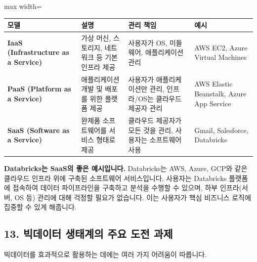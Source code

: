 \documentclass[11pt,a4paper]{article}
\theoremstyle{definition}
\begin{document}
\begin{adjustbox}{max width=\textwidth}
\begin{tabular}{llll}
\toprule
\textbf{모델} & \textbf{설명} & \textbf{관리 책임} & \textbf{예시} \\
\midrule
\textbf{IaaS (Infrastructure as a Service)} & 가상 머신, 스토리지, 네트워크 등 기본 인프라 제공 & 사용자가 OS, 미들웨어, 애플리케이션 관리 & AWS EC2, Azure Virtual Machines \\
\textbf{PaaS (Platform as a Service)} & 애플리케이션 개발 및 배포를 위한 플랫폼 제공 & 사용자가 애플리케이션만 관리, 인프라/OS는 클라우드 제공자 관리 & AWS Elastic Beanstalk, Azure App Service \\
\textbf{SaaS (Software as a Service)} & 완제품 소프트웨어를 서비스 형태로 제공 & 클라우드 제공자가 모든 것을 관리, 사용자는 소프트웨어 사용 & Gmail, Salesforce, Databricks \\
\bottomrule
\end{tabular}
\end{adjustbox}

\begin{examplebox}
\textbf{Databricks는 SaaS의 좋은 예시입니다.}
Databricks는 AWS, Azure, GCP와 같은 클라우드 인프라 위에 구축된 소프트웨어 서비스입니다. 사용자는 Databricks 플랫폼에 접속하여 데이터 파이프라인을 구축하고 분석을 수행할 수 있으며, 하부 인프라(서버, OS 등) 관리에 대해 걱정할 필요가 없습니다. 이는 사용자가 핵심 비즈니스 로직에 집중할 수 있게 해줍니다.
\end{examplebox}

\subsection*{13. 빅데이터 생태계의 주요 도전 과제}

빅데이터를 효과적으로 활용하는 데에는 여러 가지 어려움이 따릅니다.
\end{document}
